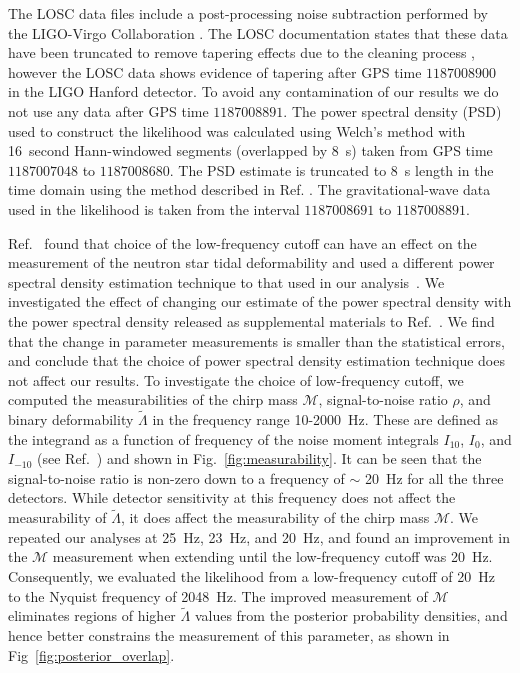 The LOSC data files include a post-processing noise subtraction performed by the LIGO-Virgo Collaboration \cite{gw170817-losc,gw170817-noise}. The LOSC documentation states that these data have been truncated to remove tapering effects due to the cleaning process \cite{gw170817-losc}, however the LOSC data shows evidence of tapering after GPS time $1187008900$ in the LIGO Hanford detector. To avoid any contamination of our results we do not use any data after GPS time $1187008891$. The power spectral density (PSD) used to construct the likelihood was calculated using Welch's method \cite{1161901} with 16~second Hann-windowed segments (overlapped by 8~s) taken from GPS time $1187007048$ to $1187008680$. The PSD estimate is truncated to 8~s length in the time domain using the method described in Ref. \cite{Allen:2005fk}. The gravitational-wave data used in the likelihood is taken from the interval $1187008691$ to $1187008891$. 

Ref.~\cite{Abbott:2018wiz} found that choice of the low-frequency cutoff can have an effect on the measurement of the neutron star tidal deformability and used a different power spectral density estimation technique to that used in our analysis~\cite{Littenberg:2014oda}. We investigated the effect of changing our estimate of the power spectral density with the power spectral density released as supplemental materials to Ref.~\cite{Abbott:2018wiz}. We find that the change in parameter measurements is smaller than the statistical errors, and conclude that the choice of power spectral density estimation technique does not affect our results. To investigate the choice of low-frequency cutoff, we computed the measurabilities of the chirp mass $\mathcal{M}$, signal-to-noise ratio $\rho$, and binary deformability $\tilde{\Lambda}$ in the frequency range 10-2000~Hz. These are defined as the integrand as a function of frequency of the noise moment integrals $I_{\mathrm 10}$, $I_{\mathrm 0}$, and $I_{\mathrm -10}$ (see Ref.~\cite{Damour:2012yf}) and shown in Fig.~\ref{fig:measurability}. It can be seen that the signal-to-noise ratio is non-zero down to a frequency of $\sim$ 20~Hz for all the three detectors. While detector sensitivity at this frequency does not affect the measurability of $\tilde\Lambda$, it does affect the measurability of the chirp mass $\mathcal{M}$. We repeated our analyses at 25~Hz, 23~Hz, and 20~Hz, and found an improvement in the $\mathcal{M}$ measurement when extending until the low-frequency cutoff was 20~Hz. Consequently, we evaluated the likelihood from a low-frequency cutoff of 20~Hz to the Nyquist frequency of 2048~Hz. The improved measurement of $\mathcal{M}$ eliminates regions of higher $\tilde{\Lambda}$ values from the posterior probability densities, and hence better constrains the measurement of this parameter, as shown in Fig~\ref{fig:posterior_overlap}.

